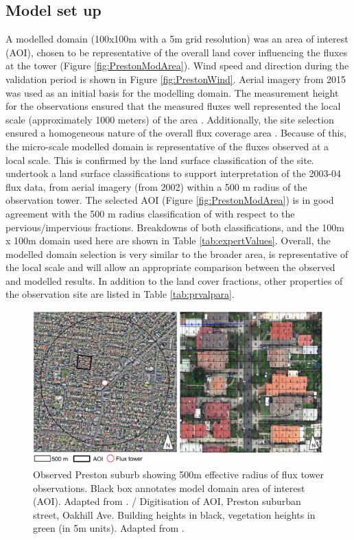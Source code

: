 \documentclass[final,3p,times,authoryear]{elsarticle}
\begin{document}
\subsection{Model set up}

A modelled domain (100x100m with a 5m grid resolution) was an area of interest (AOI), chosen to be representative of the overall land cover influencing the fluxes at the tower (Figure \ref{fig:PrestonModArea}). Wind speed and direction during the validation period is shown in Figure \ref{fig:PrestonWind}. Aerial imagery from 2015 \citep{GooglePreston2015} was used as an initial basis for the modelling domain. The measurement height for the observations ensured that the measured fluxes well represented the local scale (approximately 1000 meters) of the area \citep{Coutts2007}. Additionally, the site selection ensured a homogeneous nature of the overall flux coverage area \citep{Schmid1994}. Because of this, the micro-scale modelled domain is representative of the fluxes observed at a local scale. This is confirmed by the land surface classification of the site. \cite{Coutts2007} undertook a land surface classifications to support interpretation of the 2003-04 flux data, from aerial imagery (from 2002) within a 500 m radius of the observation tower. The selected AOI (Figure \ref{fig:PrestonModArea}) is in good agreement with the 500 m radius classification of \cite{Coutts2007} with respect to the pervious/impervious fractions. Breakdowns of both classifications, and the 100m x 100m domain used here are shown in Table \ref{tab:expertValues}. Overall, the modelled domain selection is very similar to the broader area, is representative of the local scale and will allow an appropriate comparison between the observed and modelled results. In addition to the land cover fractions, other properties of the observation site are listed in Table \ref{tab:prvalpara}.

\begin{figure}[!htbp]
\includegraphics[trim = 0mm 0mm 0mm 0mm, clip, scale=1.00]{images/PrestonModelledArea.png} 
\caption{Observed Preston suburb showing 500m effective radius of flux tower observations. Black box annotates model domain area of interest (AOI). Adapted from \cite{GooglePreston2015}.\label{fig:PrestonModArea} / Digitisation of AOI, Preston suburban street, Oakhill Ave. Building heights in black, vegetation heights in green (in 5m units). Adapted from \cite{Nearmap2015}.\label{fig:PrestonDigitization}}      
\end{figure}
\end{document}
